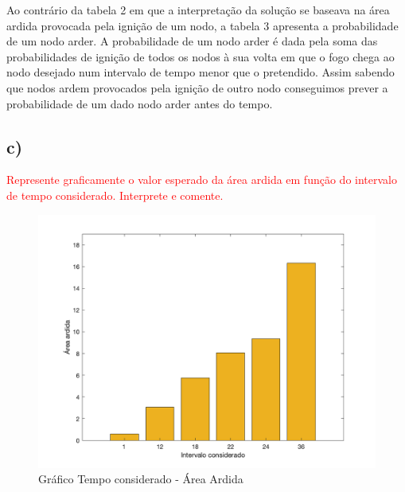 \documentclass[11pt]{article} %
\begin{document}
Ao contrário da tabela 2 em que a interpretação da solução se baseava na área ardida provocada pela ignição de um nodo, a tabela 3 apresenta a probabilidade de um nodo arder. A probabilidade de um nodo arder é dada pela soma das probabilidades de ignição de todos os nodos à sua volta em que o fogo chega ao nodo desejado num intervalo de tempo menor que o pretendido. Assim sabendo que nodos ardem provocados pela ignição de outro nodo conseguimos prever a probabilidade de um dado nodo arder antes do tempo.
\newpage
\subsection*{c)}
\textcolor{red}{Represente graficamente o valor esperado da área ardida em função do intervalo
de tempo considerado. Interprete e comente.}
\begin{figure}[h]
    \centering
    \includegraphics[scale=0.3]{graf3.png}
    \caption{Gráfico Tempo considerado - Área Ardida}
\end{figure}
\end{document}
